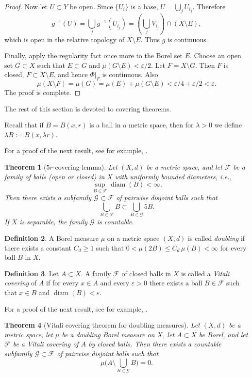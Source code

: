 \documentclass[12pt,leqno]{amsart}
\newtheorem{theorem}{Theorem}
\theoremstyle{definition}
\newtheorem{definition}[theorem]{Definition}
\newcommand{\eps}{\varepsilon}
\def\diam{\operatorname{diam}}
\numberwithin{theorem}{section} \numberwithin{equation}{section}
\begin{document}
\begin{proof}
Now let $U\subset Y$ be open. Since $\{U_i\}$ is a base, $U=\bigcup_j U_{i_j}$.
Therefore
\[
g^{-1}(U)=\bigcup_j g^{-1}(U_{i_j})
=\left(\bigcup_j V_{i_j}\right)\cap (X\setminus E),
\]
which is open in the relative topology of $X\setminus E$. Thus $g$ is continuous.

Finally, apply the regularity fact once more to the Borel set $E$. Choose an open
set $G\subset X$ such that $E\subset G$ and $\mu(G\setminus E)<\varepsilon/2$.
Let $F=X\setminus G$. Then $F$ is closed, $F\subset X\setminus E$, and hence
$\Phi|_F$ is continuous. Also
\[
\mu(X\setminus F)=\mu(G)=\mu(E)+\mu(G\setminus E)
<\varepsilon/4+\varepsilon/2<\varepsilon.
\]
The proof is complete.
\end{proof}



The rest of this section is devoted to covering theorems.

Recall that if $B=B(x,r)$ is a ball in a metric space, then for $\lambda>0$ we define $\lambda B:=B(x,\lambda r)$.

For a proof of the next result, see for example, \cite[Theorem~1.2]{heinonen}.
\begin{theorem}[$5r$-covering lemma]
\label{AT7}
Let $(X,d)$ be a metric space, and let $\mathcal{F}$ be a family of balls (open or closed) in $X$ with uniformly bounded diameters, i.e.,
\[
\sup_{B\in\mathcal{F}} \operatorname{diam}(B)<\infty.
\]
Then there exists a subfamily $\mathcal{G}\subset \mathcal{F}$ of pairwise disjoint balls such that
\[
\bigcup_{B\in\mathcal{F}} B \subset \bigcup_{B\in\mathcal{G}} 5B.
\]
If $X$ is separable, the family $\mathcal{G}$ is countable.
\end{theorem}

\begin{definition}
A Borel measure $\mu$ on a metric space $(X,d)$ is called \emph{doubling} if there exists a constant $C_d\ge 1$ such that $0<\mu(2B)\le C_d\,\mu(B)<\infty$
for every ball $B$ in $X$.
\end{definition}

\begin{definition}
Let $A\subset X$. A family $\mathcal{F}$ of closed balls in $X$ is called a \emph{Vitali covering} of $A$ if for every $x\in A$ and every $\eps>0$ there exists a ball
$B\in\mathcal{F}$ such that $x\in B$ and $\diam(B)<\eps$.
\end{definition}

For a proof of the next result, see for example, \cite[Theorem~1.6]{heinonen}.
\begin{theorem}[Vitali covering theorem for doubling measures]
\label{AT6}
Let $(X,d)$ be a metric space, let $\mu$ be a doubling Borel measure on $X$, let $A\subset X$ be Borel, and let $\mathcal{F}$ be a Vitali covering of $A$ by closed balls. Then there exists a countable  subfamily $\mathcal{G}\subset \mathcal{F}$ of pairwise disjoint balls such that
\[
\mu\Big(A\setminus \bigcup_{B\in\mathcal{G}}B\Big)=0.
\]
\end{theorem}
\end{document}
